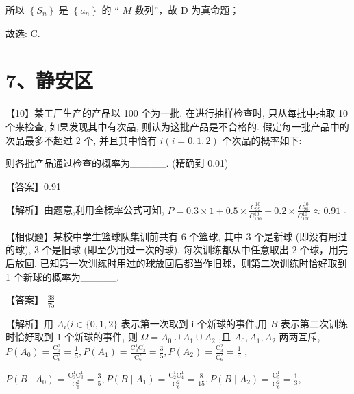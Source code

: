 \documentclass[10pt]{article}
\begin{document}
所以 \(\left\{  {S}_{n}\right\}\) 是 \(\left\{  {a}_{n}\right\}\) 的 “ \(M\) 数列”，故 D 为真命题；

故选: C.

\section*{7、静安区}

【10】某工厂生产的产品以 100 个为一批. 在进行抽样检查时, 只从每批中抽取 10 个来检查, 如果发现其中有次品, 则认为这批产品是不合格的. 假定每一批产品中的次品最多不超过 2 个, 并且其中恰有 \(i\left( {i = 0,1,2}\right)\) 个次品的概率如下:

\begin{center}
\end{center}

则各批产品通过检查的概率为\_\_\_\_\_. (精确到 0.01)

【答案】0.91

【解析】由题意,利用全概率公式可知, \(P = {0.3} \times  1 + {0.5} \times  \frac{{C}_{99}^{10}}{{C}_{100}^{10}} + {0.2} \times  \frac{{C}_{98}^{10}}{{C}_{100}^{10}} \approx  {0.91}\) .

【相似题】某校中学生篮球队集训前共有 6 个篮球, 其中 3 个是新球 (即没有用过的球), 3 个是旧球 (即至少用过一次的球). 每次训练都从中任意取出 2 个球，用完后放回. 已知第一次训练时用过的球放回后都当作旧球，则第二次训练时恰好取到 1 个新球的概率为\_\_\_\_\_.

【答案】 \(\frac{38}{75}\)

【解析】用 \({A}_{i}(i \in  \{ 0,1,2\}\) 表示第一次取到 \(\mathrm{i}\) 个新球的事件,用 \(B\) 表示第二次训练时恰好取到 1 个新球的事件, 则 \(\Omega  = {A}_{0} \cup  {A}_{1} \cup  {A}_{2}\) ,且 \({A}_{0},{A}_{1},{A}_{2}\) 两两互斥, \(P\left( {A}_{0}\right)  = \frac{{\mathrm{C}}_{3}^{2}}{{\mathrm{C}}_{6}^{2}} = \frac{1}{5},P\left( {A}_{1}\right)  = \frac{{\mathrm{C}}_{3}^{1}{\mathrm{C}}_{3}^{1}}{{\mathrm{C}}_{6}^{2}} = \frac{3}{5},P\left( {A}_{2}\right)  = \frac{{\mathrm{C}}_{3}^{2}}{{\mathrm{C}}_{6}^{2}} = \frac{1}{5}\) ,

\(P\left( {B \mid  {A}_{0}}\right)  = \frac{{\mathrm{C}}_{3}^{1}{\mathrm{C}}_{3}^{1}}{{\mathrm{C}}_{6}^{2}} = \frac{3}{5},P\left( {B \mid  {A}_{1}}\right)  = \frac{{\mathrm{C}}_{2}^{1}{\mathrm{C}}_{4}^{1}}{{\mathrm{C}}_{6}^{2}} = \frac{8}{15},P\left( {B \mid  {A}_{2}}\right)  = \frac{{\mathrm{C}}_{5}^{1}}{{\mathrm{C}}_{6}^{2}} = \frac{1}{3},\)
\end{document}

